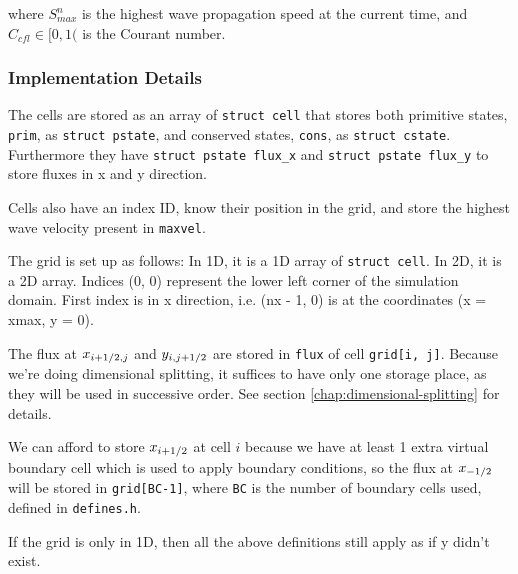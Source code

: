 where $S_{max}^n$ is the highest wave propagation speed at the current time, and $C_{cfl} \in [0, 1($ is the Courant number.














\subsubsection{Implementation Details}\label{chap:godunov-details}


The cells are stored as an array of \verb|struct cell| that stores both primitive states, \texttt{prim}, as  \texttt{struct pstate}, and conserved states, \texttt{cons}, as \texttt{struct cstate}.
Furthermore they have \verb|struct pstate flux_x| and \verb|struct pstate flux_y| to store fluxes in x and y direction.


Cells also have an index ID, know their position in the grid, and store the highest wave velocity present in \texttt{maxvel}.


The grid is set up as follows:
In 1D, it is a 1D array of \texttt{struct cell}.
In 2D, it is a 2D array.
Indices (0, 0) represent the lower left corner of the simulation domain.
First index is in x direction, i.e. (nx - 1, 0) is at the coordinates (x = xmax, y = 0).


The flux at $x_{i+1/2, j}$ and $y_{i, j+1/2}$ are stored in \verb|flux| of cell \verb|grid[i, j]|.
Because we're doing dimensional splitting, it suffices to have only one storage place, as they will be used in successive order.
See section \ref{chap:dimensional-splitting} for details.

We can afford to store $x_{i+1/2}$ at cell $i$ because we have at least 1 extra virtual boundary cell which is used to apply boundary conditions, so the flux at $x_{-1/2}$ will be stored in \verb|grid[BC-1]|, where \texttt{BC} is the number of boundary cells used, defined in \texttt{defines.h}.
 

If the grid is only in 1D, then all the above definitions still apply as if y didn't exist.











